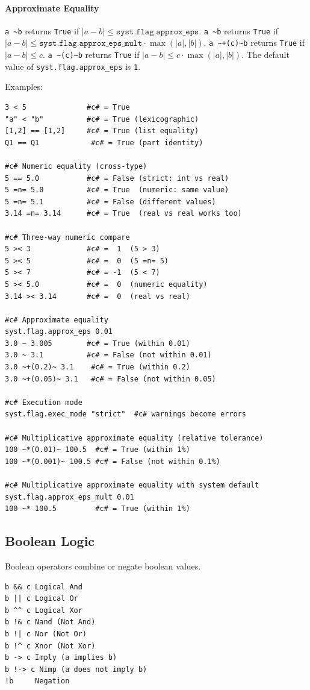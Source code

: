 \paragraph{Approximate Equality}
\texttt{a \textasciitilde b} returns \texttt{True} if $|a - b| \leq \texttt{syst.flag.approx\_eps}$.
\texttt{a \textasciitilde* b} returns \texttt{True} if $|a - b| \leq \texttt{syst.flag.approx\_eps\_mult} \cdot \max(|a|, |b|)$.
\texttt{a \textasciitilde+(c)\textasciitilde b} returns \texttt{True} if $|a - b| \leq c$.
\texttt{a \textasciitilde*(c)\textasciitilde b} returns \texttt{True} if $|a - b| \leq c \cdot \max(|a|, |b|)$.
The default value of \texttt{syst.flag.approx\_eps} is \texttt{1}.

Examples:
\begin{verbatim}
3 < 5              #c# = True
"a" < "b"          #c# = True (lexicographic)
[1,2] == [1,2]     #c# = True (list equality)
Q1 == Q1            #c# = True (part identity)

#c# Numeric equality (cross-type)
5 == 5.0           #c# = False (strict: int vs real)
5 =n= 5.0          #c# = True  (numeric: same value)
5 =n= 5.1          #c# = False (different values)
3.14 =n= 3.14      #c# = True  (real vs real works too)

#c# Three-way numeric compare
5 >< 3             #c# =  1  (5 > 3)
5 >< 5             #c# =  0  (5 =n= 5)
5 >< 7             #c# = -1  (5 < 7)
5 >< 5.0           #c# =  0  (numeric equality)
3.14 >< 3.14       #c# =  0  (real vs real)

#c# Approximate equality
syst.flag.approx_eps 0.01
3.0 ~ 3.005        #c# = True (within 0.01)
3.0 ~ 3.1          #c# = False (not within 0.01)
3.0 ~+(0.2)~ 3.1    #c# = True (within 0.2)
3.0 ~+(0.05)~ 3.1   #c# = False (not within 0.05)

#c# Execution mode
syst.flag.exec_mode "strict"  #c# warnings become errors

#c# Multiplicative approximate equality (relative tolerance)
100 ~*(0.01)~ 100.5  #c# = True (within 1%)
100 ~*(0.001)~ 100.5 #c# = False (not within 0.1%)

#c# Multiplicative approximate equality with system default
syst.flag.approx_eps_mult 0.01
100 ~* 100.5         #c# = True (within 1%)
\end{verbatim}

\subsection{Boolean Logic}
Boolean operators combine or negate boolean values.
\begin{verbatim}
b && c Logical And
b || c Logical Or
b ^^ c Logical Xor
b !& c Nand (Not And)
b !| c Nor (Not Or)
b !^ c Xnor (Not Xor)
b -> c Imply (a implies b)
b !-> c Nimp (a does not imply b)
!b     Negation
\end{verbatim}


